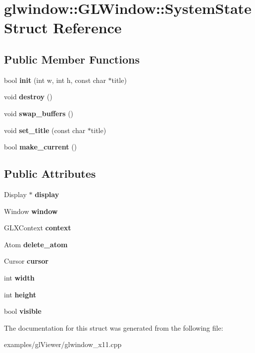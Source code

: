 \section{glwindow\+:\+:G\+L\+Window\+:\+:System\+State Struct Reference}
\label{struct_g_l_window_1_1_system_state}
\subsection*{Public Member Functions}
\begin{DoxyCompactItemize}
\item 
\mbox{\label{struct_g_l_window_1_1_system_state_a5c10afc9873e8429448fc085230099a4}} 
bool {\bfseries init} (int w, int h, const char $\ast$title)
\item 
\mbox{\label{struct_g_l_window_1_1_system_state_a0eccf6dc59ec9e8b062eb8cd56398e60}} 
void {\bfseries destroy} ()
\item 
\mbox{\label{struct_g_l_window_1_1_system_state_aecbb2620bcb643e4bad1280b5ae5c9f5}} 
void {\bfseries swap\+\_\+buffers} ()
\item 
\mbox{\label{struct_g_l_window_1_1_system_state_a760021e568f2dc7e0cc5a68fb835321e}} 
void {\bfseries set\+\_\+title} (const char $\ast$title)
\item 
\mbox{\label{struct_g_l_window_1_1_system_state_ad553d495b4f03b0cb666cb9916ba1180}} 
bool {\bfseries make\+\_\+current} ()
\end{DoxyCompactItemize}
\subsection*{Public Attributes}
\begin{DoxyCompactItemize}
\item 
\mbox{\label{struct_g_l_window_1_1_system_state_aeb17b154bf55aba75b2f807a2dac47f6}} 
Display $\ast$ {\bfseries display}
\item 
\mbox{\label{struct_g_l_window_1_1_system_state_aa2dff48b0d656cb10a97ce6eb7fbee56}} 
Window {\bfseries window}
\item 
\mbox{\label{struct_g_l_window_1_1_system_state_ab6ba4ef9e4aca634aad36b9e652e6c9f}} 
G\+L\+X\+Context {\bfseries context}
\item 
\mbox{\label{struct_g_l_window_1_1_system_state_a6901cb96188585fcf83cf46192ded4b1}} 
Atom {\bfseries delete\+\_\+atom}
\item 
\mbox{\label{struct_g_l_window_1_1_system_state_a8477bec2ff201a8dd407becfd0c104a1}} 
Cursor {\bfseries cursor}
\item 
\mbox{\label{struct_g_l_window_1_1_system_state_aae54ccdc33e813e058623555d182b963}} 
int {\bfseries width}
\item 
\mbox{\label{struct_g_l_window_1_1_system_state_a3ca4777d7371ae47f53a8dd69690e9c6}} 
int {\bfseries height}
\item 
\mbox{\label{struct_g_l_window_1_1_system_state_a7f931ca36a980cd9ff1c00dacf410dd2}} 
bool {\bfseries visible}
\end{DoxyCompactItemize}


The documentation for this struct was generated from the following file\+:\begin{DoxyCompactItemize}
\item 
examples/gl\+Viewer/glwindow\+\_\+x11.\+cpp\end{DoxyCompactItemize}
